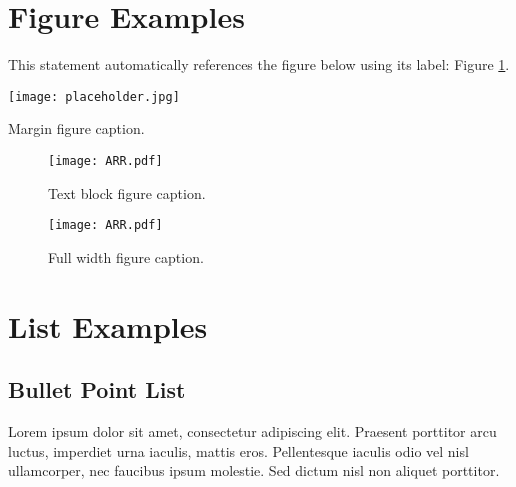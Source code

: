 \documentclass[
	letterpaper, %
	12pt, %
]{CSSullivanBusinessReport}
\begin{document}
\section{Figure Examples}

This statement automatically references the figure below using its label: Figure \ref{fig:example}.


\begin{marginfigure} %
	\texttt{[image: placeholder.jpg]}
	\caption{Margin figure caption.}
\end{marginfigure}


\begin{figure}[H] %
	\texttt{[image: ARR.pdf]}
	\caption{Text block figure caption.}
	\label{fig:example} %
\end{figure}


\begin{figure*} %
	\texttt{[image: ARR.pdf]}
	\caption{Full width figure caption.}
\end{figure*}


\section{List Examples}

\subsection{Bullet Point List}

Lorem ipsum dolor sit amet, consectetur adipiscing elit. Praesent porttitor arcu luctus, imperdiet urna iaculis, mattis eros. Pellentesque iaculis odio vel nisl ullamcorper, nec faucibus ipsum molestie. Sed dictum nisl non aliquet porttitor.
\end{document}
